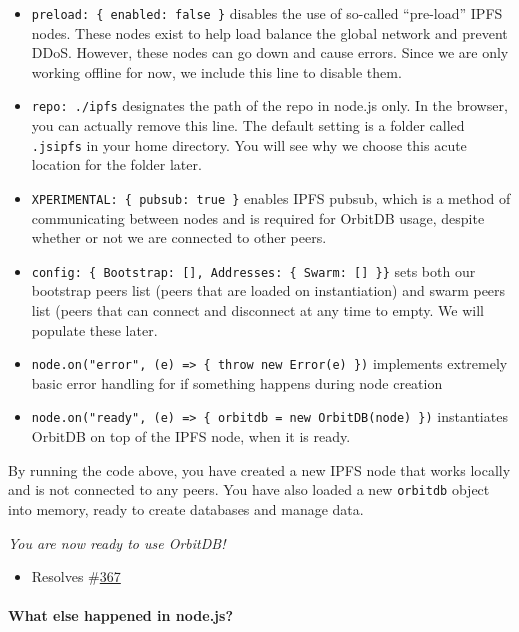\begin{itemize}
\tightlist
\item
  \texttt{preload:\ \{\ enabled:\ false\ \}} disables the use of
  so-called ``pre-load'' IPFS nodes. These nodes exist to help load
  balance the global network and prevent DDoS. However, these nodes can
  go down and cause errors. Since we are only working offline for now,
  we include this line to disable them.
\item
  \texttt{repo:\ \textquotesingle{}./ipfs\textquotesingle{}} designates
  the path of the repo in node.js only. In the browser, you can actually
  remove this line. The default setting is a folder called
  \texttt{.jsipfs} in your home directory. You will see why we choose
  this acute location for the folder later.
\item
  \texttt{XPERIMENTAL:\ \{\ pubsub:\ true\ \}} enables IPFS pubsub,
  which is a method of communicating between nodes and is required for
  OrbitDB usage, despite whether or not we are connected to other peers.
\item
  \texttt{config:\ \{\ Bootstrap:\ {[}{]},\ Addresses:\ \{\ Swarm:\ {[}{]}\ \}\}}
  sets both our bootstrap peers list (peers that are loaded on
  instantiation) and swarm peers list (peers that can connect and
  disconnect at any time to empty. We will populate these later.
\item
  \texttt{node.on("error",\ (e)\ =\textgreater{}\ \{\ throw\ new\ Error(e)\ \})}
  implements extremely basic error handling for if something happens
  during node creation
\item
  \texttt{node.on("ready",\ (e)\ =\textgreater{}\ \{\ orbitdb\ =\ new\ OrbitDB(node)\ \})}
  instantiates OrbitDB on top of the IPFS node, when it is ready.
\end{itemize}

By running the code above, you have created a new IPFS node that works
locally and is not connected to any peers. You have also loaded a new
\texttt{orbitdb} object into memory, ready to create databases and
manage data.

\emph{You are now ready to use OrbitDB!}

\begin{itemize}
\tightlist
\item
  Resolves \#\href{https://github.com/orbitdb/orbit-db/issues/367}{367}
\end{itemize}

\paragraph{What else happened in
node.js?}\label{what-else-happened-in-node.js}


